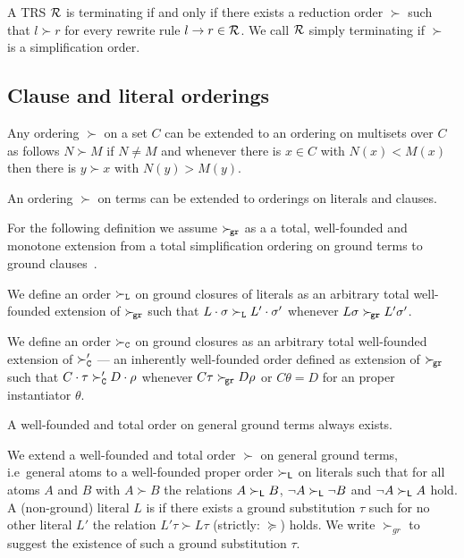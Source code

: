 \begin{theorem}
	A TRS \( \mathcal{R} \) is terminating if and only if there exists a reduction order \( \succ \)
	such that \( l\succ r \) for every rewrite rule \( l\rightarrow r\in\mathcal{R} \).
	We call \( \mathcal{R} \) simply terminating if \( \succ \) is a simplification order.
\end{theorem}

\subsection{Clause and literal orderings}

\begin{lemma}
	Any ordering \( \succ \) on a set \( C \) can be extended to an ordering on multisets over \( C \)
	as follows \( N \succ M \) if \( N \neq M \)
	and whenever there is \( x\in C \) with \( N(x) < M(x) \)
	then there is \( y \succ x \) with \( N(y) > M(y) \).

	An ordering \( \succ \) on terms can be extended to orderings on literals and clauses.
\end{lemma}
For the following definition we assume
\( \mathrel\succ_{\!\mathtt{gr}} \) as a a total, well-founded and monotone extension
from a total simplification ordering on ground terms
to ground clauses~\cite{NR2001}.

\begin{definition}
    We define an order \( \mathrel\succ_{\mathtt{L}} \) on ground closures of literals
    as an arbitrary total well-founded extension of \( \mathrel\succ_{\!\mathtt{gr}} \)
    such that
    \( L\cdot\sigma\mathrel\succ_{\mathtt{L}} L'\cdot\sigma' \) whenever
    \( L\sigma\mathrel\succ_{\!\mathtt{gr}} L'\sigma' \).

    We define an order \( \mathrel\succ_{\mathtt{C}} \) on ground closures
    as an arbitrary total well-founded extension of
    \( \mathrel\succ_{\mathtt{C}}' \) --- an inherently well-founded order defined as extension of \( \mathrel\succ_{\!\mathtt{gr}} \)
    such that
    \( C\cdot\tau\mathrel\succ_{\mathtt{C}}' D\cdot\rho \) whenever
    \( C\tau\mathrel\succ_{\!\mathtt{gr}} D\rho \) or \( C\theta = D \) for an proper instantiator \( \theta \).
\end{definition}

\begin{lemma}A well-founded and total order on general ground terms always exists.\end{lemma}

	\begin{definition}\label{def:orders-on-literals}
		We extend a well-founded and total order \( \succ \) on general ground terms,
		i.e~general atoms to a well-founded proper order \( \succ_{\mathsf{L}} \)
		on literals such that for all atoms \( A \) and \( B \) with \( A\succ B \)
		the relations \( A\succ_{\mathsf{L}} B \),
		\( \lnot A\succ_{\mathsf{L}}\lnot B \) and
		\( \lnot A\succ_{\mathsf{L}} A \) hold.
		A (non-ground) literal \( L \) is  if there exists a ground substitution \( \tau \)
		such for no other literal \( L' \) the relation \( L'\tau\succ L\tau \) (strictly: \( \succcurlyeq \)) holds.
		We write \( \succ_{gr} \) to suggest the existence of such a ground substitution \( \tau \).
	\end{definition}



